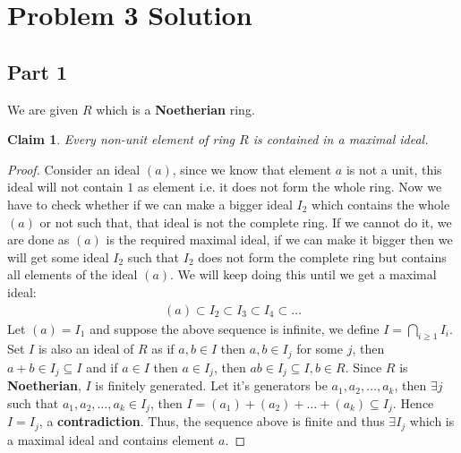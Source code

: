\documentclass{article}
\let\bold\textbf
\newtheorem{claim}{Claim}[subsection]
\begin{document}
\section{Problem 3 Solution}{
  \subsection{Part 1}{
    We are given $R$ which is a \bold{Noetherian} ring.
    \begin{claim}
      Every non-unit element of ring $R$ is contained in a maximal ideal.
    \end{claim}
    \begin{proof}
      Consider an ideal $(a)$, since we know that element $a$ is not a unit, this ideal will not contain $1$ as element i.e. it does not form the whole ring. \newline
      Now we have to check whether if we can make a bigger ideal $I_2$ which contains the whole $(a)$ or not such that, that ideal is not the complete ring. \newline
      If we cannot do it, we are done as $(a)$ is the required maximal ideal, if we can make it bigger then we will get some ideal $I_2$ such that $I_2$ does not form the complete ring but contains all elements of the ideal $(a)$. \newline
      We will keep doing this until we get a maximal ideal:
      \begin{align*}
        (a) \subset I_2 \subset I_3 \subset I_4 \subset \dots
      \end{align*}
      Let $(a)=I_1$ and suppose the above sequence is infinite, we define $I={\bigcap}_{i\geq1}I_i$. Set $I$ is also an ideal of $R$ as if $a,b \in I$ then $a,b \in I_j$ for some $j$, then $a+b \in I_j \subseteq I$ and if $a \in I$ then $a \in I_j$, then $ab \in I_j \subseteq I, b \in R$. \newline
      Since $R$ is \bold{Noetherian}, $I$ is finitely generated. Let it's generators be $a_1, a_2, \dots, a_k$, then $\exists j$ such that $a_1,a_2,\dots,a_k\in I_j$, then $I=(a_1)+(a_2)+\dots+(a_k) \subseteq I_j$. Hence $I=I_j$, a \bold{contradiction}. \newline
      Thus, the sequence above is finite and thus $\exists I_j$ which is a maximal ideal and contains element $a$.
    \end{proof}
  }
}
\end{document}
